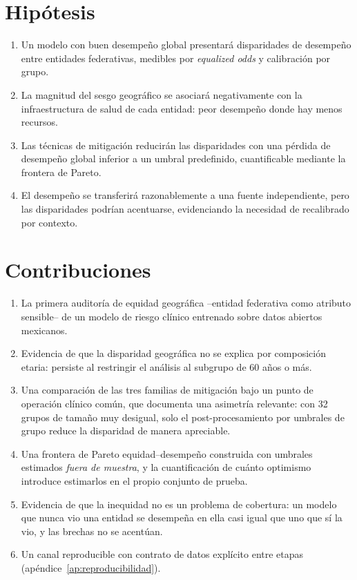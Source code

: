 \section{Hipótesis}

\begin{enumerate}[label=H\arabic*., ref=H\arabic*, leftmargin=*]
  \item \label{h1} Un modelo con buen desempeño global presentará disparidades
    de desempeño entre entidades federativas, medibles por \emph{equalized odds}
    y calibración por grupo.
  \item \label{h2} La magnitud del sesgo geográfico se asociará negativamente
    con la infraestructura de salud de cada entidad: peor desempeño donde hay
    menos recursos.
  \item \label{h3} Las técnicas de mitigación reducirán las disparidades con una
    pérdida de desempeño global inferior a un umbral predefinido, cuantificable
    mediante la frontera de Pareto.
  \item \label{h4} El desempeño se transferirá razonablemente a una fuente
    independiente, pero las disparidades podrían acentuarse, evidenciando la
    necesidad de recalibrado por contexto.
\end{enumerate}

\section{Contribuciones}

\begin{enumerate}[leftmargin=*]
  \item La primera auditoría de equidad geográfica --entidad federativa como
    atributo sensible-- de un modelo de riesgo clínico entrenado sobre datos
    abiertos mexicanos.
  \item Evidencia de que la disparidad geográfica no se explica por composición
    etaria: persiste al restringir el análisis al subgrupo de 60 años o más.
  \item Una comparación de las tres familias de mitigación bajo un punto de
    operación clínico común, que documenta una asimetría relevante: con 32
    grupos de tamaño muy desigual, solo el post-procesamiento por umbrales de
    grupo reduce la disparidad de manera apreciable.
  \item Una frontera de Pareto equidad--desempeño construida con umbrales
    estimados \emph{fuera de muestra}, y la cuantificación de cuánto optimismo
    introduce estimarlos en el propio conjunto de prueba.
  \item Evidencia de que la inequidad no es un problema de cobertura: un modelo
    que nunca vio una entidad se desempeña en ella casi igual que uno que sí la vio,
    y las brechas no se acentúan.
  \item Un canal reproducible con contrato de datos explícito entre etapas
    (apéndice~\ref{ap:reproducibilidad}).
\end{enumerate}

